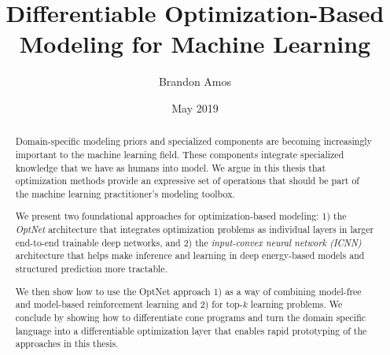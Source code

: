 \documentclass[12pt]{cmuthesis}
\begin{document}
\frontmatter

\pagestyle{empty}

\title{{\bf Differentiable Optimization-Based Modeling for Machine Learning}}
\author{Brandon Amos}
\date{May 2019}


\support{
}
\disclaimer{}


\maketitle


\begin{abstract}
  Domain-specific modeling priors and specialized components are
  becoming increasingly important to the machine learning field.
  These components integrate specialized knowledge that we have
  as humans into model.
  We argue in this thesis that optimization methods provide an
  expressive set of operations that should be part of the
  machine learning practitioner's modeling toolbox.

  We present two foundational approaches for optimization-based modeling:
  1) the \emph{OptNet} architecture that integrates
  optimization problems as individual layers in larger end-to-end
  trainable deep networks, and
  2) the \emph{input-convex neural network (ICNN)}
  architecture that helps make inference and learning in deep
  energy-based models and structured prediction more tractable.

  We then show how to use the OptNet approach
  1) as a way of combining model-free and model-based reinforcement
  learning and
  2) for top-$k$ learning problems.
  We conclude by showing how to differentiate cone programs
  and turn the \cvxpy domain specific language into
  a differentiable optimization layer that enables rapid prototyping of
  the approaches in this thesis.
\end{abstract}
\end{document}
